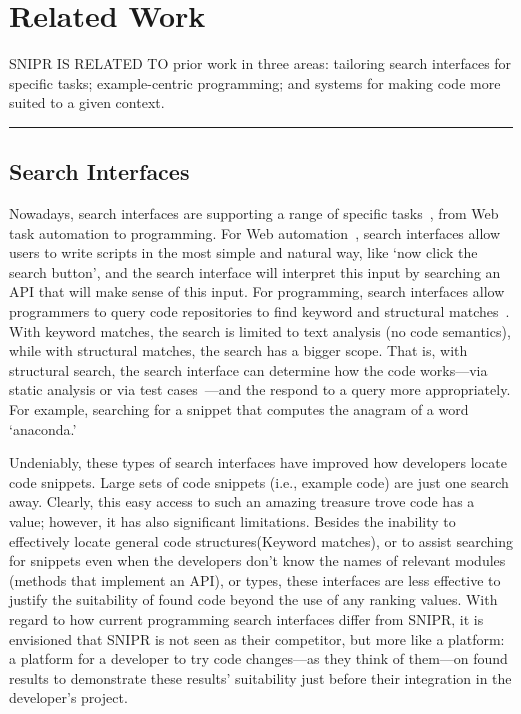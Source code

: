 \chapter{Related Work}{}
\label{sec:related}

\lettrine[lraise=0.1, nindent=0em, slope=-.5em]{S} {NIPR IS RELATED TO} prior work in three areas: tailoring search interfaces for specific tasks; example-centric programming; and systems for making code more suited to a given context.

\fancybreak{\pfbreakdisplay}

\section{Search Interfaces}
\label{sec:searchengines}

Nowadays, search interfaces are supporting a range of specific tasks~\cite{Brandt:2009jb, Morville:2010up, Wightman:2012gc}, from Web task automation to programming. For Web automation~\cite{Little:2007dh, Miller:2008ge, Cypher:2010ub}, search interfaces allow users to write scripts in the most simple and natural way, like `now click the search button', and the search interface will interpret this input by searching an API that will make sense of this input. For programming, search interfaces allow programmers to query code repositories to find keyword and structural matches~\cite{Mandelin:2005uj, Bajracharya:2006vn, Sahavechaphan:2006tc, Bajracharya:2010um}. With keyword matches, the search is limited to text analysis (no code semantics), while with structural matches, the search has a bigger scope. That is, with structural search, the search interface can determine how the code works---via static analysis or via test cases~\cite{Hummel:eq, LazzariniLemos:2007jh, Reiss:2009fu}---and the respond to a query more appropriately. For example, searching for a snippet that computes the anagram of a word `anaconda.' 

Undeniably, these types of search interfaces have improved how developers locate code snippets. Large sets of code snippets (i.e., example code) are just one search away. Clearly, this easy access to such an amazing treasure trove code has a value; however, it has also significant limitations. Besides the inability to effectively locate general code structures(Keyword matches), or to assist searching for snippets even when the developers don't know the names of relevant modules (methods that implement an API), or types, these interfaces are less effective to justify the suitability of found code beyond the use of any ranking values. With regard to how current programming search interfaces differ from \uppercase{SnipR}, it is envisioned that \uppercase{SnipR} is not seen as their competitor, but more like a platform: a platform for a developer to try code changes---as they think of them---on found results to demonstrate these results' suitability just before their integration in the developer's project. 

